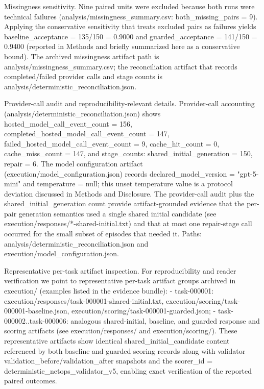 \documentclass[conference]{IEEEtran}
\begin{document}
Missingness sensitivity. Nine paired units were excluded because both runs were technical failures (analysis/missingness\_summary.csv: both\_missing\_pairs = 9). Applying the conservative sensitivity that treats excluded pairs as failures yields baseline\_acceptance = 135/150 = 0.9000 and guarded\_acceptance = 141/150 = 0.9400 (reported in Methods and briefly summarized here as a conservative bound). The archived missingness artifact path is analysis/missingness\_summary.csv; the reconciliation artifact that records completed/failed provider calls and stage counts is analysis/deterministic\_reconciliation.json.

Provider-call audit and reproducibility-relevant details. Provider-call accounting (analysis/deterministic\_reconciliation.json) shows hosted\_model\_call\_event\_count = 156, completed\_hosted\_model\_call\_event\_count = 147, failed\_hosted\_model\_call\_event\_count = 9, cache\_hit\_count = 0, cache\_miss\_count = 147, and stage\_counts: shared\_initial\_generation = 150, repair = 6. The model configuration artifact (execution/model\_configuration.json) records declared\_model\_version = "gpt-5-mini" and temperature = null; this unset temperature value is a protocol deviation discussed in Methods and Disclosure. The provider-call audit plus the shared\_initial\_generation count provide artifact-grounded evidence that the per-pair generation semantics used a single shared initial candidate (see execution/responses/*-shared-initial.txt) and that at most one repair-stage call occurred for the small subset of episodes that needed it. Paths: analysis/deterministic\_reconciliation.json and execution/model\_configuration.json.

Representative per-task artifact inspection. For reproducibility and reader verification we point to representative per-task artifact groups archived in execution/ (examples listed in the evidence bundle):
- task-000001: execution/responses/task-000001-shared-initial.txt, execution/scoring/task-000001-baseline.json, execution/scoring/task-000001-guarded.json;
- task-000002..task-000006: analogous shared-initial, baseline, and guarded response and scoring artifacts (see execution/responses/ and execution/scoring/). 
These representative artifacts show identical shared\_initial\_candidate content referenced by both baseline and guarded scoring records along with validator validation\_before/validation\_after snapshots and the scorer\_id = deterministic\_netops\_validator\_v5, enabling exact verification of the reported paired outcomes.
\end{document}
